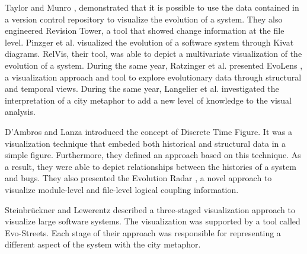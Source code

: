 Taylor and Munro \cite{Taylor2002},  demonstrated that it is possible to use the data contained in a version control repository to visualize the evolution of a system.
They also engineered Revision Tower, a tool that showed change information at the file level. 
Pinzger et al. \cite{Pinzger2005} visualized the evolution of a software system through Kivat diagrams.
RelVis, their tool, was able to depict a multivariate visualization of the evolution of a system.
During the same year, Ratzinger et al. presented EvoLens \cite{Ratzinger2005}, a visualization approach and tool to 
explore evolutionary data through structural and temporal views.  
During the same year, Langelier et al. \cite{Langelier2005} investigated the interpretation of a city metaphor 
\cite{Knight2000} to add a new level of knowledge to the visual analysis.

D’Ambros and Lanza \cite{DAmbros2006} introduced the concept of Discrete Time Figure. It was a 
 visualization technique that embeded both historical and structural data in a simple figure. 
Furthermore, they defined an approach based on this technique. As a result, they were able to depict relationships between the histories of a system and bugs. 
They also presented the Evolution Radar \cite{DAmbros2006a}, a novel approach to visualize module-level and file-level logical coupling information.

  

Steinbrückner and Lewerentz \cite{Steinbrueckner2010} described a three-staged visualization approach to visualize large software systems. 
The visualization was supported by a tool called Evo-Streets. 
Each stage of their approach was responsible for representing a different aspect of the system with the city metaphor. 



